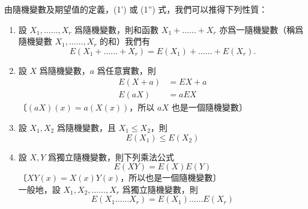 \medskip
由隨機變數及期望值的定義，(1') 或 (1'') 式，我們可以推得下列性質：
\begin{enumerate}[label=\arabic*., leftmargin=2em, itemsep=0.3em]
  \item 設 $X_1, \ldots\ldots, X_r$ 爲隨機變數，則和函數 $X_1 + \ldots\ldots + X_r$ 亦爲一隨機變數（稱爲隨機變數 $X_1, \ldots\ldots, X_r$ 的和）我們有
  \begin{equation}\tag{2}\label{eq:b5s-5-2-2}
  E(X_1 + \ldots\ldots + X_r) = E(X_1) + \ldots\ldots + E(X_r).
  \end{equation}
  \item 設 $X$ 爲隨機變數，$a$ 爲任意實數，則
  \begin{align}
  E(X+a) &= EX + a \tag{3}\label{eq:b5s-5-2-3} \\
  E(aX) &= aEX \tag{4}\label{eq:b5s-5-2-4}
  \end{align}
  〔$(aX)(x) = a(X(x))$，所以 $aX$ 也是一個隨機變數〕
  \item 設 $X_1, X_2$ 爲隨機變數，且 $X_1 \le X_2$，則
  \begin{equation}\tag{5}\label{eq:b5s-5-2-5}
  E(X_1) \le E(X_2)
  \end{equation}
  \item 設 $X, Y$ 爲獨立隨機變數，則下列乘法公式
  \begin{equation}\tag{6}\label{eq:b5s-5-2-6}
  E(XY) = E(X)E(Y)
  \end{equation}
  〔$XY(x) = X(x)Y(x)$，所以也是一個隨機變數〕\\
  一般地，設 $X_1, X_2, \ldots\ldots, X_r$ 爲獨立隨機變數，則
  \begin{equation}\tag{$6'$}\label{eq:b5s-5-2-6p}
  E(X_1 \ldots\ldots X_r) = E(X_1) \ldots\ldots E(X_r)
  \end{equation}
\end{enumerate}

\medskip
